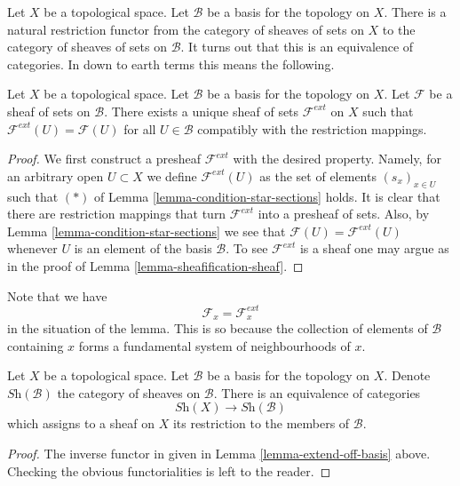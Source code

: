 \noindent
Let $X$ be a topological space.
Let $\mathcal{B}$ be a basis for the topology on $X$.
There is a natural restriction functor from the category
of sheaves of sets on $X$ to the category of sheaves of
sets on $\mathcal{B}$. It turns out that this is an equivalence
of categories. In down to earth terms this means the following.

\begin{lemma}
\label{lemma-extend-off-basis}
Let $X$ be a topological space.
Let $\mathcal{B}$ be a basis for the topology on $X$.
Let $\mathcal{F}$ be a sheaf of sets on $\mathcal{B}$.
There exists a unique sheaf of sets $\mathcal{F}^{ext}$
on $X$ such that $\mathcal{F}^{ext}(U) = \mathcal{F}(U)$
for all $U \in \mathcal{B}$ compatibly with the restriction
mappings.
\end{lemma}

\begin{proof}
We first construct a presheaf $\mathcal{F}^{ext}$ with the
desired property. Namely, for an arbitrary open $U \subset X$ we
define $\mathcal{F}^{ext}(U)$ as the set of elements 
$(s_x)_{x \in U}$ such that $(*)$ of
Lemma \ref{lemma-condition-star-sections} holds.
It is clear that there are restriction mappings
that turn $\mathcal{F}^{ext}$ into a presheaf of sets.
Also, by Lemma \ref{lemma-condition-star-sections} we
see that $\mathcal{F}(U) = \mathcal{F}^{ext}(U)$ 
whenever $U$ is an element of the basis $\mathcal{B}$.
To see $\mathcal{F}^{ext}$ is a sheaf one may
argue as in the proof of Lemma \ref{lemma-sheafification-sheaf}.
\end{proof}

\noindent
Note that we have
$$
\mathcal{F}_x = \mathcal{F}_x^{ext}
$$
in the situation of the lemma. This is so because the
collection of elements of $\mathcal{B}$ containing
$x$ forms a fundamental system of neighbourhoods of $x$.

\begin{lemma}
\label{lemma-restrict-basis-equivalence}
Let $X$ be a topological space.
Let $\mathcal{B}$ be a basis for the topology on $X$.
Denote $\textit{Sh}(\mathcal{B})$ the category of
sheaves on $\mathcal{B}$.
There is an equivalence of categories
$$
\textit{Sh}(X) \longrightarrow \textit{Sh}(\mathcal{B})
$$
which assigns to a sheaf on $X$ its restriction to
the members of $\mathcal{B}$.
\end{lemma}

\begin{proof}
The inverse functor in given in Lemma \ref{lemma-extend-off-basis} above.
Checking the obvious functorialities is left to the
reader.
\end{proof}


